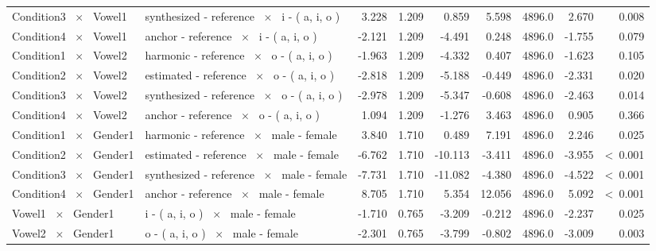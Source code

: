 \documentclass[a4paper,man,hidelinks,floatsintext]{apa7}
\begin{document}
\begin{table}[!htbp]
\begin{adjustbox}{max size={\columnwidth}{\textheight}}
\begin{tabular}{llrrrrrrr}
Condition3 ~$\times$~ Vowel1  & synthesized - reference ~$\times$~ i - ( a, i, o ) &    3.228 & 1.209 &   0.859 &   5.598 & 4896.0 &   2.670 &           0.008 \\
Condition4 ~$\times$~ Vowel1  & anchor - reference ~$\times$~ i - ( a, i, o )      &   -2.121 & 1.209 &  -4.491 &   0.248 & 4896.0 &  -1.755 &           0.079 \\
Condition1 ~$\times$~ Vowel2  & harmonic - reference ~$\times$~ o - ( a, i, o )    &   -1.963 & 1.209 &  -4.332 &   0.407 & 4896.0 &  -1.623 &           0.105 \\
Condition2 ~$\times$~ Vowel2  & estimated - reference ~$\times$~ o - ( a, i, o )   &   -2.818 & 1.209 &  -5.188 &  -0.449 & 4896.0 &  -2.331 &           0.020 \\
Condition3 ~$\times$~ Vowel2  & synthesized - reference ~$\times$~ o - ( a, i, o ) &   -2.978 & 1.209 &  -5.347 &  -0.608 & 4896.0 &  -2.463 &           0.014 \\
Condition4 ~$\times$~ Vowel2  & anchor - reference ~$\times$~ o - ( a, i, o )      &    1.094 & 1.209 &  -1.276 &   3.463 & 4896.0 &   0.905 &           0.366 \\
Condition1 ~$\times$~ Gender1 & harmonic - reference ~$\times$~ male - female      &    3.840 & 1.710 &   0.489 &   7.191 & 4896.0 &   2.246 &           0.025 \\
Condition2 ~$\times$~ Gender1 & estimated - reference ~$\times$~ male - female     &   -6.762 & 1.710 & -10.113 &  -3.411 & 4896.0 &  -3.955 & \textless~0.001 \\
Condition3 ~$\times$~ Gender1 & synthesized - reference ~$\times$~ male - female   &   -7.731 & 1.710 & -11.082 &  -4.380 & 4896.0 &  -4.522 & \textless~0.001 \\
Condition4 ~$\times$~ Gender1 & anchor - reference ~$\times$~ male - female        &    8.705 & 1.710 &   5.354 &  12.056 & 4896.0 &   5.092 & \textless~0.001 \\
Vowel1 ~$\times$~ Gender1     & i - ( a, i, o ) ~$\times$~ male - female           &   -1.710 & 0.765 &  -3.209 &  -0.212 & 4896.0 &  -2.237 &           0.025 \\
Vowel2 ~$\times$~ Gender1     & o - ( a, i, o ) ~$\times$~ male - female           &   -2.301 & 0.765 &  -3.799 &  -0.802 & 4896.0 &  -3.009 &           0.003 \\
\hline
\end{tabular}
\end{adjustbox}
\begin{tablenotes} {
\small
}
\end{tablenotes}
\end{table}
      
\end{document}
